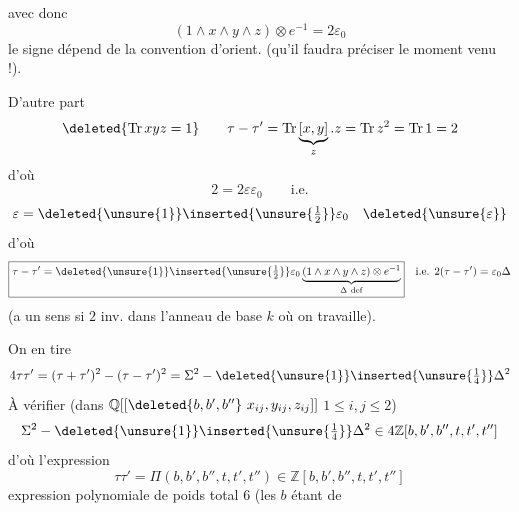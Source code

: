 avec donc
\[
(1\wedge x\wedge y\wedge z)\otimes e^{-1}=2\varepsilon_0
\]
\margin{$\varepsilon_0=\bigl[\alpha\wedge\alpha'\wedge x_0\wedge y_0\bigr)\unsure{e^{-1}}\in\pm1$}
le signe dépend de la convention d'orient. (qu'il faudra préciser le moment venu !).

D'autre part
\[
\deleted{\operatorname{Tr}xyz=1}\qquad
\tau-\tau'=\operatorname{Tr}\underbrace{[x,y]}_z.z=\operatorname{Tr}z^2=\operatorname{Tr}1=2
\]
d'où
\[
2=2\varepsilon\varepsilon_0\qquad\text{i.e.}
\]
\[
\varepsilon=\deleted{\unsure{1}}\inserted{\unsure{\tfrac12}}\varepsilon_0\quad\deleted{\unsure{\varepsilon}}
\]
d'où
\[
\boxed{\tau-\tau'=\deleted{\unsure{1}}\inserted{\unsure{\tfrac12}}\varepsilon_0\underbrace{(1\wedge x\wedge y\wedge z)\otimes e^{-1}}_{\Delta\ \mathrm{def}}}
\quad\text{i.e. }2(\tau-\tau')=\varepsilon_0\Delta
\]
(a un sens si $2$ inv. dans l'anneau de base $k$ où on travaille).

On en tire
\[
4\tau\tau'=(\tau+\tau')^2-(\tau-\tau')^2=\Sigma^2-\deleted{\unsure{1}}\inserted{\unsure{\tfrac14}}\Delta^2
\]
À vérifier (dans $\mathbb{Q}[[\deleted{b,b',b''}\ x_{ij},y_{ij},z_{ij}]]$ $1\leq i,j\leq2$)
\[
\Sigma^2-\deleted{\unsure{1}}\inserted{\unsure{\tfrac14}}\Delta^2\in4\mathbb{Z}[b,b',b'',t,t',t'']
\]
d'où l'expression
\[
\tau\tau'=\Pi(b,b',b'',t,t',t'')\in\mathbb{Z}[b,b',b'',t,t',t'']
\]
expression polynomiale de poids total $6$ (les $b$ étant de
